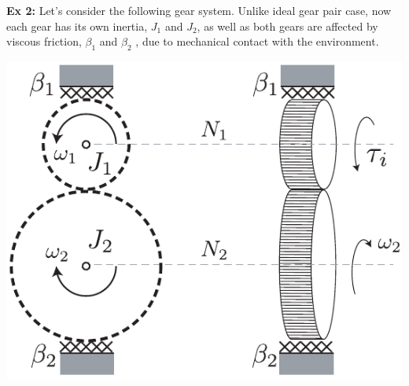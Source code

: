 \documentclass[twoside]{article}
\begin{document}
\vspace{12pt}

\textbf{Ex 2:} Let's consider the following gear system. Unlike ideal gear pair case, now each gear has its own inertia, $J_1$ and
$J_2$, as well as both gears are affected by viscous friction, $\beta_1$ and $\beta_2$ , due to mechanical contact with the environment. 

    \begin{center}
  \begin{minipage}[h]{0.75\linewidth}
    \begin{center}
      \includegraphics[width=1\textwidth]{ex2}
    \end{center}
  \end{minipage}
    \end{center}
\end{document}
